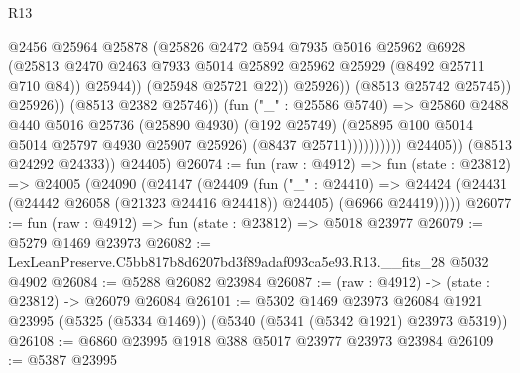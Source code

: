 \begin{lexlean}{R13}
\begin{coremodule}
                                            @2456
                                            @25964
                                            @25878
                                            (@25826
                                              @2472
                                              @594
                                              @7935
                                              @5016
                                              @25962
                                              @6928
                                              (@25813
                                                @2470
                                                @2463
                                                @7933
                                                @5014
                                                @25892
                                                @25962
                                                @25929
                                                (@8492 @25711 @710 @84))
                                              @25944))
                                          (@25948 @25721 @22))
                                        @25926))
                                    (@8513 @25742 @25745))
                                  @25926))
                              (@8513 @2382 @25746))
                            (fun ("_" : @25586 @5740) =>
                            @25860
                              @2488
                              @440
                              @5016
                              @25736
                              (@25890 @4930)
                              (@192 @25749)
                              (@25895 @100 @5014 @5014 @25797 @4930 @25907 @25926)
                              (@8437 @25711))))))))))
            @24405))
        (@8513 @24292 @24333))
      @24405)
@26074 := fun (raw : @4912) =>
  fun (state : @23812) =>
  @24005
    (@24090
      (@24147
        (@24409
          (fun ("_" : @24410) =>
          @24424 (@24431 (@24442 @26058 (@21323 @24416 @24418)) @24405) (@6966 @24419)))))
@26077 := fun (raw : @4912) => fun (state : @23812) => @5018 @23977
@26079 := @5279 @1469 @23973
@26082 := LexLeanPreserve.C5bb817b8d6207bd3f89adaf093ca5e93.R13.__fits_28 @5032 @4902
@26084 := @5288 @26082 @23984
@26087 := (raw : @4912) -> (state : @23812) -> @26079 @26084
@26101 := @5302
    @1469
    @23973
    @26084
    @1921
    @23995
    (@5325 (@5334 @1469))
    (@5340 (@5341 (@5342 @1921) @23973 @5319))
@26108 := @6860 @23995 @1918 @388 @5017 @23977 @23973 @23984
@26109 := @5387 @23995

\end{coremodule}
\end{lexlean}
